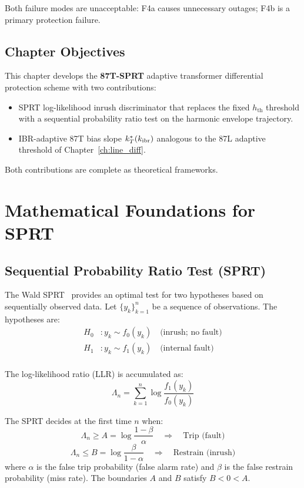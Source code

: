 Both failure modes are unacceptable: F4a causes unnecessary outages;
F4b is a primary protection failure.

\subsection{Chapter Objectives}

This chapter develops the \textbf{87T-SPRT} adaptive transformer
differential protection scheme with two contributions:

\begin{itemize}
\item SPRT log-likelihood inrush discriminator that
      replaces the fixed $h_\mathrm{th}$ threshold with a sequential
      probability ratio test on the harmonic envelope trajectory.
\item IBR-adaptive 87T bias slope $k_T^*(k_\mathrm{ibr})$
      analogous to the 87L adaptive threshold of Chapter~\ref{ch:line_diff}.
\end{itemize}

Both contributions are complete as theoretical frameworks.

\section{Mathematical Foundations for SPRT}
\label{sec:ch6_sprt_theory}

\subsection{Sequential Probability Ratio Test (SPRT)}

The Wald SPRT~\citep{Wald1947} provides an optimal test for two
hypotheses based on sequentially observed data. Let
$\{y_k\}_{k=1}^n$ be a sequence of observations. The hypotheses are:
\begin{align}
  H_0 &: y_k \sim f_0(y_k) \quad \text{(inrush; no fault)} \\
  H_1 &: y_k \sim f_1(y_k) \quad \text{(internal fault)} \\
\end{align}

The log-likelihood ratio (LLR) is accumulated as:
\begin{equation}
  \Lambda_n = \sum_{k=1}^{n} \log\frac{f_1(y_k)}{f_0(y_k)}
  \label{eq:ch6_llr}
\end{equation}

The SPRT decides at the first time $n$ when:
\begin{equation}
  \Lambda_n \geq A = \log\frac{1-\beta}{\alpha}
  \quad \Rightarrow \quad \text{Trip (fault)}
  \label{eq:ch6_sprt_trip}
\end{equation}
\begin{equation}
  \Lambda_n \leq B = \log\frac{\beta}{1-\alpha}
  \quad \Rightarrow \quad \text{Restrain (inrush)}
  \label{eq:ch6_sprt_restrain}
\end{equation}
where $\alpha$ is the false trip probability (false alarm rate) and
$\beta$ is the false restrain probability (miss rate).
The boundaries $A$ and $B$ satisfy $B < 0 < A$.


